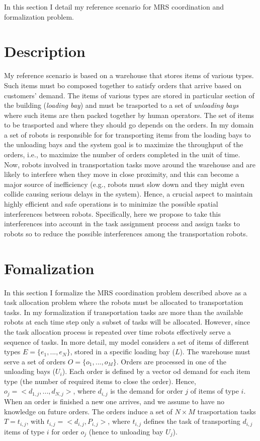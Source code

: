 In this section I detail my reference scenario for MRS coordination and formalization problem.

\section{Description}
My reference scenario is based on a warehouse that stores items of various types.
Such items must bo composed together to satisfy orders that arrive based on customers’ demand.
The items of various types are stored in particular section of the building (\textit{loading bay})
and must be trasported to a set of \textit{unloading bays} where such items are then 
packed together by human operators. The set of items to be trasported and where they should
go depends on the orders.
In my domain a set of robots is responsible for for transporting items from
the loading bays to the unloading bays and the system goal is to maximize the
throughput of the orders, i.e., to maximize the number of orders completed in
the unit of time. Now, robots involved in transportation tasks move around
the warehouse and are likely to interfere when they move in close proximity,
and this can become a major source of inefficiency (e.g., robots must slow down
and they might even collide causing serious delays in the system).
Hence, a crucial aspect to maintain highly efficient and safe operations is to minimize the
possible spatial interferences between robots. Specifically, here we propose to
take this interferences into account in the task assignment process and assign
tasks to robots so to reduce the possible interferences among the transportation
robots.


\section{Fomalization}
In this section I formalize the MRS coordination problem described above as a task allocation problem
where the robots must be allocated to transportation tasks. In my formalization if 
transportation tasks are more than the available robots at each time step only a subset 
of tasks will be allocated. However, since the task allocation process is repeated over time robots 
effectively serve a sequence of tasks. 
In more detail, my model considers a set of items of different types $E = \{ e_1,...,e_N\}$,
stored in a specific loading bay ($L$). The warehouse must serve a set of orders 
$O=\{o_1,...,o_M\}$. Orders are processed in one of the unloading bays ($U_i$).
Each order is defined by a vector od demand for each item type (the number of required 
items to close the order). Hence, $o_j = < d_{1,j},...,d_{N,j}>$, where $d_{i,j}$ is the 
demand for order $j$ of items of type $i$. When an order is finished a new one arrives,
and we assume to have no knowledge on future orders.
The orders induce a set of $N \times M$ trasportation tasks $T = {t_{i,j}}$, with 
$t_{i,j} = < d_{i,j}, P_{i,j}>$, where $t_{i,j}$ defines the task of transporting 
$d_{i,j}$ items of type $i$ for order $o_j$ (hence to unloading bay $U_j$).
